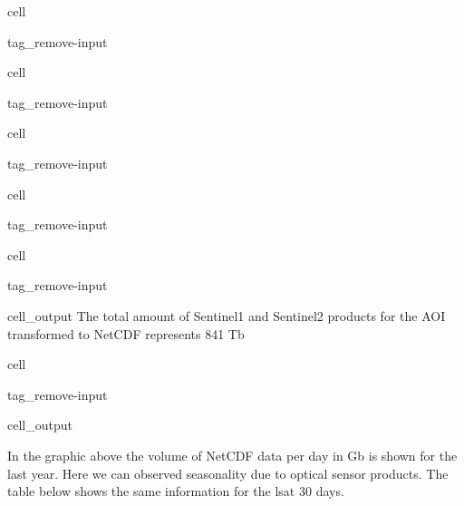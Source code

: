 \documentclass[letterpaper,10pt,english]{jupyterBook}
\begin{document}
\begin{sphinxuseclass}{cell}
\begin{sphinxuseclass}{tag_remove-input}
\end{sphinxuseclass}
\end{sphinxuseclass}
\begin{sphinxuseclass}{cell}
\begin{sphinxuseclass}{tag_remove-input}
\end{sphinxuseclass}
\end{sphinxuseclass}
\begin{sphinxuseclass}{cell}
\begin{sphinxuseclass}{tag_remove-input}
\end{sphinxuseclass}
\end{sphinxuseclass}
\begin{sphinxuseclass}{cell}
\begin{sphinxuseclass}{tag_remove-input}
\end{sphinxuseclass}
\end{sphinxuseclass}
\begin{sphinxuseclass}{cell}
\begin{sphinxuseclass}{tag_remove-input}\begin{sphinxVerbatimOutput}

\begin{sphinxuseclass}{cell_output}
\sphinxAtStartPar
The total amount of Sentinel\sphinxhyphen{}1 and Sentinel\sphinxhyphen{}2 products for the AOI transformed to NetCDF represents 841 Tb

\end{sphinxuseclass}\end{sphinxVerbatimOutput}

\end{sphinxuseclass}
\end{sphinxuseclass}
\begin{sphinxuseclass}{cell}
\begin{sphinxuseclass}{tag_remove-input}\begin{sphinxVerbatimOutput}

\begin{sphinxuseclass}{cell_output}
\noindent{}

\end{sphinxuseclass}\end{sphinxVerbatimOutput}

\end{sphinxuseclass}
\end{sphinxuseclass}
\sphinxAtStartPar
In the graphic above the volume of NetCDF data per day in Gb is shown for the last year. Here we can observed seasonality due to optical sensor products. The table below shows the same information for the lsat 30 days.
\end{document}

